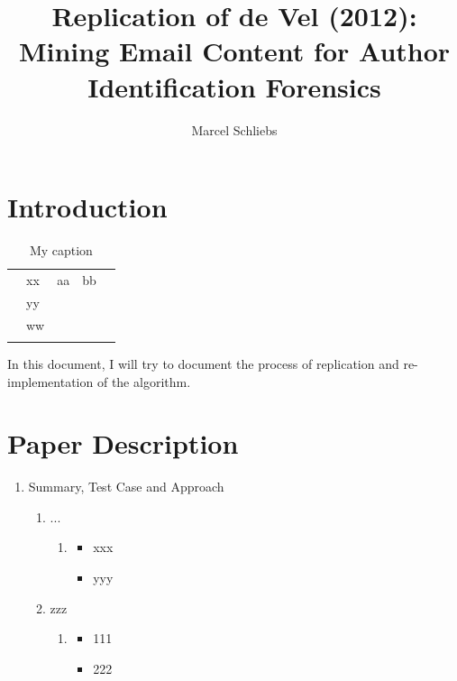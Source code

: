 \documentclass[a4paper,man,natbib]{apa6}
\title{Replication of de Vel (2012): Mining Email Content for Author Identification Forensics}
\author{Marcel Schliebs}
\affiliation{Studienstiftung natur- und ingenieurswissenschaftliches Forschungskolleg}
\begin{document}
\maketitle

\section{Introduction}

\begin{table}[]
	\centering
	\caption{My caption}
	\label{my-label}
	\begin{tabular}{lllll}
		& xx & aa & bb  &  \\
		& yy &  &   &  \\
		& ww &  &   &  \\
		&  &  &   & 
	\end{tabular}
\end{table}	

In this document, I will try to document the process of replication and re-implementation of the algorithm. 

\section{Paper Description}
\label{sec:Paper Description}

 \begin{enumerate}
	\item Summary, Test Case and Approach
		\begin{enumerate}
		\item ...
		\begin{enumerate}
			\item 
				\begin{itemize}
					\item xxx
					\item yyy
				\end{itemize}
		\end{enumerate}
			\item zzz
	\begin{enumerate}
		\item 
		\begin{itemize}
			\item 111
			\item 222
		\end{itemize}
	\end{enumerate}
\end{enumerate}
\end{enumerate}
\end{document}
